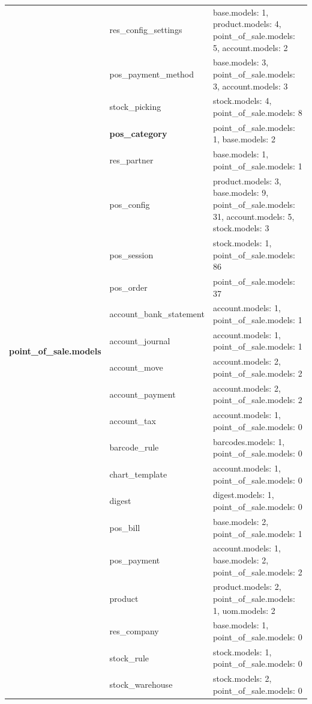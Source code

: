 \begin{longtable}{|c|p{4cm}|p{7cm}|}
	\hline
\multirow{22}{*}{\textbf{point{\_}of{\_}sale.models}} &  res{\_}config{\_}settings &  base.models: 1, product.models: 4, point{\_}of{\_}sale.models: 5, account.models: 2 \\ \cline{2-3}  &  pos{\_}payment{\_}method &  base.models: 3, point{\_}of{\_}sale.models: 3, account.models: 3 \\ \cline{2-3}  &  stock{\_}picking &  stock.models: 4, point{\_}of{\_}sale.models: 8 \\ \cline{2-3}  &  \textbf{pos{\_}category} &  point{\_}of{\_}sale.models: 1, base.models: 2 \\ \cline{2-3}  &  res{\_}partner &  base.models: 1, point{\_}of{\_}sale.models: 1 \\ \cline{2-3}  &  pos{\_}config &  product.models: 3, base.models: 9, point{\_}of{\_}sale.models: 31, account.models: 5, stock.models: 3 \\ \cline{2-3}  &  pos{\_}session &  stock.models: 1, point{\_}of{\_}sale.models: 86 \\ \cline{2-3}  &  pos{\_}order &  point{\_}of{\_}sale.models: 37 \\ \cline{2-3}  &  account{\_}bank{\_}statement &  account.models: 1, point{\_}of{\_}sale.models: 1 \\ \cline{2-3}  &  account{\_}journal &  account.models: 1, point{\_}of{\_}sale.models: 1 \\ \cline{2-3}  &  account{\_}move &  account.models: 2, point{\_}of{\_}sale.models: 2 \\ \cline{2-3}  &  account{\_}payment &  account.models: 2, point{\_}of{\_}sale.models: 2 \\ \cline{2-3}  &  account{\_}tax &  account.models: 1, point{\_}of{\_}sale.models: 0 \\ \cline{2-3}  &  barcode{\_}rule &  barcodes.models: 1, point{\_}of{\_}sale.models: 0 \\ \cline{2-3}  &  chart{\_}template &  account.models: 1, point{\_}of{\_}sale.models: 0 \\ \cline{2-3}  &  digest &  digest.models: 1, point{\_}of{\_}sale.models: 0 \\ \cline{2-3}  &  pos{\_}bill &  base.models: 2, point{\_}of{\_}sale.models: 1 \\ \cline{2-3}  &  pos{\_}payment &  account.models: 1, base.models: 2, point{\_}of{\_}sale.models: 2 \\ \cline{2-3}  &  product &  product.models: 2, point{\_}of{\_}sale.models: 1, uom.models: 2 \\ \cline{2-3}  &  res{\_}company &  base.models: 1, point{\_}of{\_}sale.models: 0 \\ \cline{2-3}  &  stock{\_}rule &  stock.models: 1, point{\_}of{\_}sale.models: 0 \\ \cline{2-3}  &  stock{\_}warehouse &  stock.models: 2, point{\_}of{\_}sale.models: 0 \\


\end{longtable}
